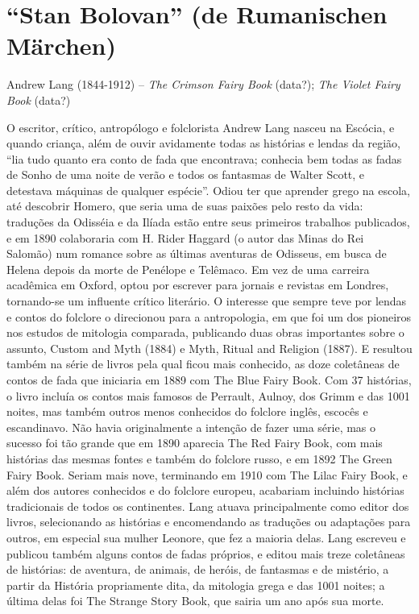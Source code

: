 \section{“Stan Bolovan” (de Rumanischen Märchen)}

Andrew Lang (1844-1912) -- \textit{The Crimson Fairy Book} (data?); 
\textit{The Violet Fairy Book}  (data?)

O escritor, crítico, antropólogo e folclorista Andrew Lang nasceu na
Escócia, e quando criança, além de ouvir avidamente todas as
histórias e lendas da região, “lia tudo quanto era conto de fada que
encontrava; conhecia bem todas as fadas de Sonho de uma noite de
verão e todos os fantasmas de Walter Scott, e detestava máquinas de
qualquer espécie”. Odiou ter que aprender grego na escola, até
descobrir Homero, que seria uma de suas paixões pelo resto da vida:
traduções da Odisséia e da Ilíada estão entre seus primeiros
trabalhos publicados, e em 1890 colaboraria com H. Rider Haggard (o
autor das Minas do Rei Salomão) num romance sobre as últimas
aventuras de Odisseus, em busca de Helena depois da morte de Penélope
e Telêmaco. Em vez de uma carreira acadêmica em Oxford, optou por
escrever para jornais e revistas em Londres, tornando-se um influente
crítico literário. O interesse que sempre teve por lendas e contos do
folclore o direcionou para a antropologia, em que foi um dos
pioneiros nos estudos de mitologia comparada, publicando duas obras
importantes sobre o assunto, Custom and Myth (1884) e Myth, Ritual
and Religion (1887). E resultou também na série de livros pela qual
ficou mais conhecido, as doze coletâneas de contos de fada que
iniciaria em 1889 com The Blue Fairy Book. Com 37 histórias, o livro
incluía os contos mais famosos de Perrault, Aulnoy, dos Grimm e das
1001 noites, mas também outros menos conhecidos do folclore inglês,
escocês e escandinavo. Não havia originalmente a intenção de fazer
uma série, mas o sucesso foi tão grande que em 1890 aparecia The Red
Fairy Book, com mais histórias das mesmas fontes e também do folclore
russo, e em 1892 The Green Fairy Book. Seriam mais nove, terminando
em 1910 com The Lilac Fairy Book, e além dos autores conhecidos e do
folclore europeu, acabariam incluindo histórias tradicionais de todos
os continentes. Lang atuava principalmente como editor dos livros,
selecionando as histórias e encomendando as traduções ou adaptações
para outros, em especial sua mulher Leonore, que fez a maioria delas.
Lang escreveu e publicou também alguns contos de fadas próprios, e
editou mais treze coletâneas de histórias: de aventura, de animais,
de heróis, de fantasmas e de mistério, a partir da História
propriamente dita, da mitologia grega e das 1001 noites; a última
delas foi The Strange Story Book, que sairia um ano após sua morte. 


